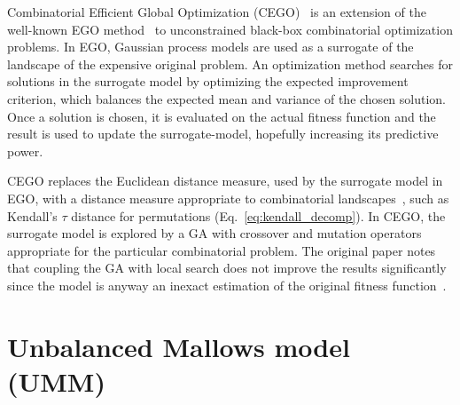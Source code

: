 \documentclass[runningheads]{llncs}
\begin{document}
Combinatorial Efficient Global Optimization
(CEGO)~\citep{ZaeStoFriFisNauBar2014} is an extension of the well-known EGO
method~\citep{JonSchWel98go} to unconstrained black-box combinatorial
optimization problems. In EGO, Gaussian process models are used as a surrogate
of the landscape of the expensive original problem. An optimization method
searches for solutions in the surrogate model by optimizing the expected
improvement criterion, which balances the expected mean and variance of the
chosen solution. Once a solution is chosen, it is evaluated on the actual
fitness function and the result is used to update the surrogate-model,
hopefully increasing its predictive power.

CEGO replaces the Euclidean distance measure, used by the surrogate model in
EGO, with a distance measure appropriate to combinatorial
landscapes~\citep{ZaeStoBar2014:ppsn}, such as Kendall's $\tau$ distance for
permutations (Eq.~\ref{eq:kendall_decomp}). In CEGO, the surrogate model is
explored by a GA with crossover and mutation operators appropriate for the
particular combinatorial problem. The original paper notes that coupling the GA
with local search does not improve the results significantly since the model is
anyway an inexact estimation of the original fitness
function~\citep[p.~875]{ZaeStoFriFisNauBar2014}.



\renewcommand{\subsubsection}{\smallskip{}\noindent\textbf}



\section{Unbalanced Mallows model (UMM)}

\end{document}
